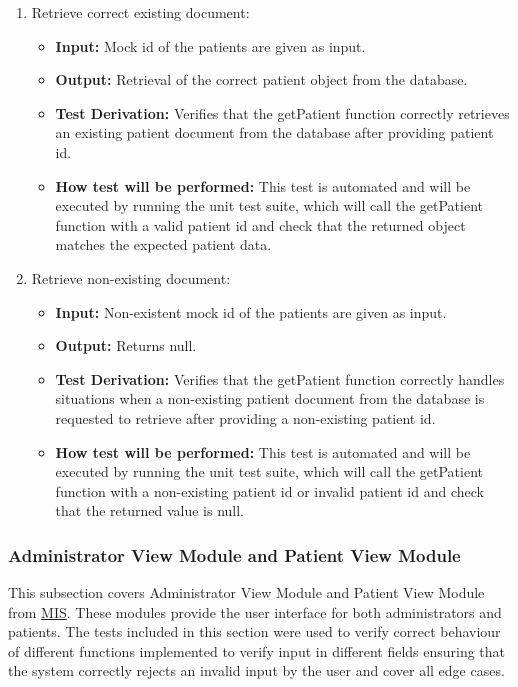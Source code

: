 \documentclass[12pt, titlepage]{article}
\begin{document}
\begin{enumerate}
  \item Retrieve correct existing document:
    \begin{itemize}
      \item \textbf{Input:} Mock id of the patients are given as input.  
      \item \textbf{Output:} Retrieval of the correct patient object from the database. 
      \item \textbf{Test Derivation:} Verifies that the getPatient function correctly retrieves an existing patient document from the database after providing patient id.
      \item \textbf{How test will be performed:} This test is automated and will be executed by running the unit test suite, which will call the getPatient function with a valid patient id and check that the returned object matches the expected patient data.
    \end{itemize}

  \item Retrieve non-existing document:
    \begin{itemize}
      \item \textbf{Input:} Non-existent mock id of the patients are given as input.  
      \item \textbf{Output:} Returns null. 
      \item \textbf{Test Derivation:} Verifies that the getPatient function correctly handles situations when a non-existing patient document from the database is requested to retrieve after providing a non-existing patient id.
      \item \textbf{How test will be performed:} This test is automated and will be executed by running the unit test suite, which will call the getPatient function with a non-existing patient id or invalid patient id and check that the returned value is null.
    \end{itemize}
\end{enumerate}

\subsubsection{Administrator View Module and Patient View Module}

This subsection covers Administrator View Module and Patient View Module from \href{https://github.com/PKALXI/RapidCare/blob/main/docs/Design/SoftDetailedDes/MIS.pdf}{MIS}. These modules provide the user interface for both administrators and patients. The tests included in this section were used to verify correct behaviour of different functions implemented to verify input in different fields ensuring that the system correctly rejects an invalid input by the user and cover all edge cases.
\end{document}
